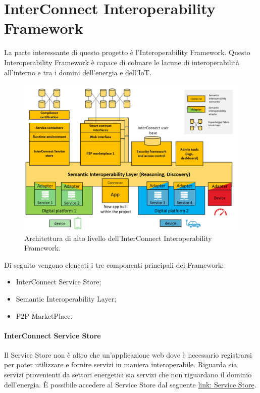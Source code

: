 \section{InterConnect Interoperability Framework}
La parte interessante di questo progetto è l'Interoperability Framework.
Questo Interoperability Framework è capace di colmare le lacune di interoperabilità all'interno e tra i domini dell'energia e dell'IoT.

\begin{figure}[H]
    \centering
    \includegraphics[width=\textwidth]{figures/architetturaFrameworkInterconnect.png}
    \caption{Architettura di alto livello dell'InterConnect Interoperability Framework.}
    \label{fig:architetturaFrameworkInterconnect}
\end{figure}

Di seguito vengono elencati i tre componenti principali del Framework:
\begin{itemize}
    \item InterConnect Service Store;
    \item Semantic Interoperability Layer;
    \item P2P MarketPlace.
\end{itemize}

\paragraph{InterConnect Service Store}

Il Service Store non è altro che un'applicazione web dove è necessario registrarsi per poter utilizzare e fornire servizi in maniera interoperabile. Riguarda sia servizi provenienti da settori energetici sia servizi che non riguardano il dominio dell'energia.
È possibile accedere al Service Store dal seguente \href{https://store.interconnectproject.eu/ServiceStore}{link: Service Store}.

